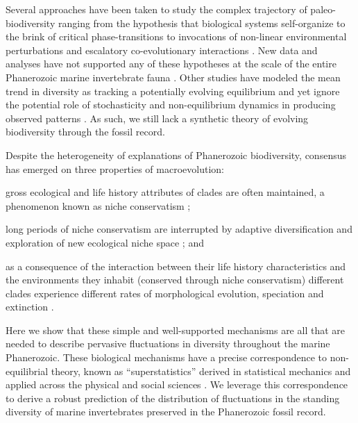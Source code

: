 \documentclass[12pt]{article}
\let\citep=\autocite
\begin{document}
Several approaches have been taken to study the complex trajectory of
paleo-biodiversity ranging from the hypothesis that biological systems
self-organize to the brink of critical phase-transitions
\citep{bak1993, sole1997} to invocations of non-linear environmental
perturbations \citep{newman1995} and escalatory co-evolutionary
interactions \citep{vermeij1987}. New data and analyses have not
supported any of these hypotheses at the scale of the entire
Phanerozoic marine invertebrate fauna \citep{kirchner1998, madin2006,
  alroy08}. Other studies have modeled the mean trend in diversity as
tracking a potentially evolving equilibrium \citep{sepkoski1984,
  alroy08, alroy2010, rabosky2009ecolLett} and yet ignore the
potential role of stochasticity and non-equilibrium dynamics in
producing observed patterns \citep{erwin2012, liow2007,
  quental2013}. As such, we still lack a synthetic theory of evolving
biodiversity through the fossil record.

Despite the heterogeneity of explanations of Phanerozoic
biodiversity, consensus has emerged on three properties of
macroevolution:
\begin{inparaenum}
\item gross ecological and life history attributes of clades
  are often maintained, a phenomenon known as niche conservatism
  \citep{roy2009range, hopkins2014};
\item long periods of niche conservatism are interrupted by adaptive
  diversification and exploration of new ecological niche space
  \citep{eldredgeGould1972, newman1985adaptive, hopkins2014}; and
\item as a consequence of the interaction between their life history
  characteristics and the environments they inhabit
  \citep{vrba1983} (conserved through niche conservatism) different
  clades experience different rates of morphological evolution,
  speciation and extinction \citep{simpson1953, sepkoski1984,
    holman1989, gilinsky1994}.
\end{inparaenum}

Here we show that these simple and well-supported mechanisms are all
that are needed to describe pervasive fluctuations in diversity
throughout the marine Phanerozoic.  These biological mechanisms have a
precise correspondence to non-equilibrial theory, known as
``superstatistics'' derived in statistical mechanics \citep{beck2003}
and applied across the physical and social sciences \citep{beck2004,
  fuentes2009}. We leverage this correspondence to derive a robust
prediction of the distribution of fluctuations in the standing
diversity of marine invertebrates preserved in the Phanerozoic fossil
record.
\end{document}
